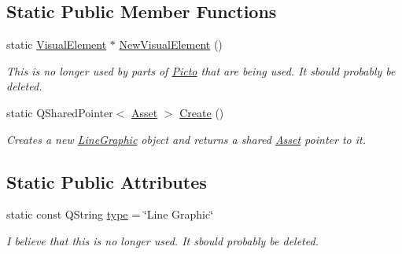 \subsection*{Static Public Member Functions}
\begin{DoxyCompactItemize}
\item 
\hypertarget{class_picto_1_1_line_graphic_a96f5b239e26698b98ad4e3ab4c56a372}{static \hyperlink{struct_picto_1_1_visual_element}{Visual\-Element} $\ast$ \hyperlink{class_picto_1_1_line_graphic_a96f5b239e26698b98ad4e3ab4c56a372}{New\-Visual\-Element} ()}\label{class_picto_1_1_line_graphic_a96f5b239e26698b98ad4e3ab4c56a372}

\begin{DoxyCompactList}\small\item\em This is no longer used by parts of \hyperlink{namespace_picto}{Picto} that are being used. It sbould probably be deleted. \end{DoxyCompactList}\item 
\hypertarget{class_picto_1_1_line_graphic_ac28ac90df5e8ed537fa4dac3f8f96f76}{static Q\-Shared\-Pointer$<$ \hyperlink{class_picto_1_1_asset}{Asset} $>$ \hyperlink{class_picto_1_1_line_graphic_ac28ac90df5e8ed537fa4dac3f8f96f76}{Create} ()}\label{class_picto_1_1_line_graphic_ac28ac90df5e8ed537fa4dac3f8f96f76}

\begin{DoxyCompactList}\small\item\em Creates a new \hyperlink{class_picto_1_1_line_graphic}{Line\-Graphic} object and returns a shared \hyperlink{class_picto_1_1_asset}{Asset} pointer to it. \end{DoxyCompactList}\end{DoxyCompactItemize}
\subsection*{Static Public Attributes}
\begin{DoxyCompactItemize}
\item 
\hypertarget{class_picto_1_1_line_graphic_aa2df2b30c05bd941e8389342e38bff9f}{static const Q\-String \hyperlink{class_picto_1_1_line_graphic_aa2df2b30c05bd941e8389342e38bff9f}{type} = \char`\"{}Line Graphic\char`\"{}}\label{class_picto_1_1_line_graphic_aa2df2b30c05bd941e8389342e38bff9f}

\begin{DoxyCompactList}\small\item\em I believe that this is no longer used. It sbould probably be deleted. \end{DoxyCompactList}\end{DoxyCompactItemize}

